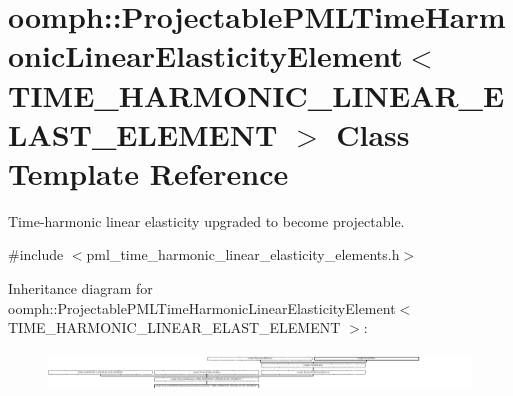 \hypertarget{classoomph_1_1ProjectablePMLTimeHarmonicLinearElasticityElement}{}\section{oomph\+:\+:Projectable\+P\+M\+L\+Time\+Harmonic\+Linear\+Elasticity\+Element$<$ T\+I\+M\+E\+\_\+\+H\+A\+R\+M\+O\+N\+I\+C\+\_\+\+L\+I\+N\+E\+A\+R\+\_\+\+E\+L\+A\+S\+T\+\_\+\+E\+L\+E\+M\+E\+NT $>$ Class Template Reference}
\label{classoomph_1_1ProjectablePMLTimeHarmonicLinearElasticityElement}


Time-\/harmonic linear elasticity upgraded to become projectable.  




{\ttfamily \#include $<$pml\+\_\+time\+\_\+harmonic\+\_\+linear\+\_\+elasticity\+\_\+elements.\+h$>$}

Inheritance diagram for oomph\+:\+:Projectable\+P\+M\+L\+Time\+Harmonic\+Linear\+Elasticity\+Element$<$ T\+I\+M\+E\+\_\+\+H\+A\+R\+M\+O\+N\+I\+C\+\_\+\+L\+I\+N\+E\+A\+R\+\_\+\+E\+L\+A\+S\+T\+\_\+\+E\+L\+E\+M\+E\+NT $>$\+:\begin{figure}[H]
\begin{center}
\leavevmode
\includegraphics[height=1.071975cm]{classoomph_1_1ProjectablePMLTimeHarmonicLinearElasticityElement}
\end{center}
\end{figure}
